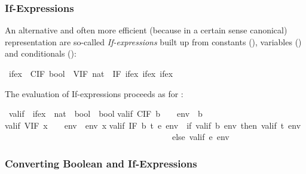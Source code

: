 \begin{isabellebody}
\begin{isamarkuptext}
\subsubsection{If-Expressions}

An alternative and often more efficient (because in a certain sense
canonical) representation are so-called \emph{If-expressions} built up
from constants (), variables () and conditionals
():%
\end{isamarkuptext}%
\ ifex\ {\isacharequal}\ CIF\ bool\ {\isacharbar}\ VIF\ nat\ {\isacharbar}\ IF\ ifex\ ifex\ ifex%
\begin{isamarkuptext}%
\noindent
The evaluation of If-expressions proceeds as for :%
\end{isamarkuptext}%
\ valif\ {\isacharcolon}{\isacharcolon}\ {\isachardoublequote}ifex\ {\isasymRightarrow}\ {\isacharparenleft}nat\ {\isasymRightarrow}\ bool{\isacharparenright}\ {\isasymRightarrow}\ bool{\isachardoublequote}\isanewline
{}\isanewline
{\isachardoublequote}valif\ {\isacharparenleft}CIF\ b{\isacharparenright}\ \ \ \ env\ {\isacharequal}\ b{\isachardoublequote}\isanewline
{\isachardoublequote}valif\ {\isacharparenleft}VIF\ x{\isacharparenright}\ \ \ \ env\ {\isacharequal}\ env\ x{\isachardoublequote}\isanewline
{\isachardoublequote}valif\ {\isacharparenleft}IF\ b\ t\ e{\isacharparenright}\ env\ {\isacharequal}\ {\isacharparenleft}if\ valif\ b\ env\ then\ valif\ t\ env\isanewline
\ \ \ \ \ \ \ \ \ \ \ \ \ \ \ \ \ \ \ \ \ \ \ \ \ \ \ \ \ \ \ \ \ \ \ \ \ \ \ \ else\ valif\ e\ env{\isacharparenright}{\isachardoublequote}%
\begin{isamarkuptext}%
\subsubsection{Converting Boolean and If-Expressions}


\end{isamarkuptext}
\end{isabellebody}
